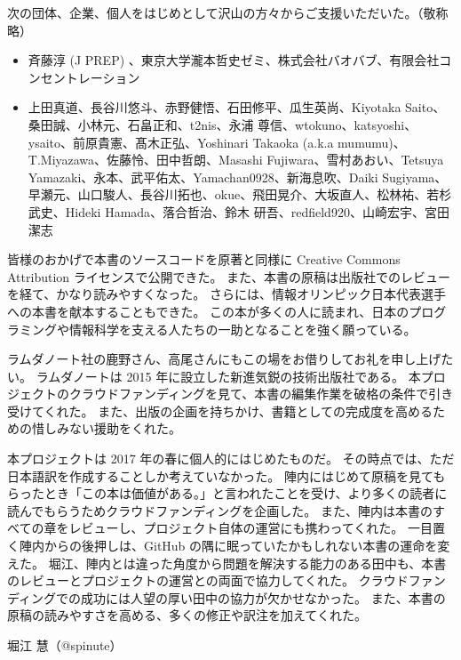 次の団体、企業、個人をはじめとして沢山の方々からご支援いただいた。（敬称略） %
\begin{itemize}
\item 斉藤淳 (J PREP) 、東京大学瀧本哲史ゼミ、株式会社バオバブ、有限会社コンセントレーション
\item 上田真道、長谷川悠斗、赤野健悟、石田修平、瓜生英尚、Kiyotaka Saito、桑田誠、小林元、石畠正和、t2nis、永浦 尊信、wtokuno、katsyoshi、ysaito、前原貴憲、髙木正弘、Yoshinari Takaoka (a.k.a mumumu)、T.Miyazawa、佐藤怜、田中哲朗、Masashi Fujiwara、雪村あおい、Tetsuya Yamazaki、永本、武平佑太、Yamachan0928、新海息吹、Daiki Sugiyama、早瀬元、山口駿人、長谷川拓也、okue、飛田晃介、大坂直人、松林祐、若杉武史、Hideki Hamada、落合哲治、鈴木 研吾、redfield920、山崎宏宇、宮田潔志
\end{itemize}

皆様のおかげで本書のソースコードを原著と同様に Creative Commons Attribution ライセンスで公開できた。
また、本書の原稿は出版社でのレビューを経て、かなり読みやすくなった。
さらには、情報オリンピック日本代表選手への本書を献本することもできた。
この本が多くの人に読まれ、日本のプログラミングや情報科学を支える人たちの一助となることを強く願っている。

ラムダノート社の鹿野さん、高尾さんにもこの場をお借りしてお礼を申し上げたい。
ラムダノートは 2015 年に設立した新進気鋭の技術出版社である。
本プロジェクトのクラウドファンディングを見て、本書の編集作業を破格の条件で引き受けてくれた。
また、出版の企画を持ちかけ、書籍としての完成度を高めるための惜しみない援助をくれた。

本プロジェクトは 2017 年の春に個人的にはじめたものだ。
その時点では、ただ日本語訳を作成することしか考えていなかった。
陣内にはじめて原稿を見てもらったとき「この本は価値がある。」と言われたことを受け、より多くの読者に読んでもらうためクラウドファンディングを企画した。
また、陣内は本書のすべての章をレビューし、プロジェクト自体の運営にも携わってくれた。
一目置く陣内からの後押しは、GitHub の隅に眠っていたかもしれない本書の運命を変えた。
堀江、陣内とは違った角度から問題を解決する能力のある田中も、本書のレビューとプロジェクトの運営との両面で協力してくれた。
クラウドファンディングでの成功には人望の厚い田中の協力が欠かせなかった。
また、本書の原稿の読みやすさを高める、多くの修正や訳注を加えてくれた。

堀江 慧（@spinute）

